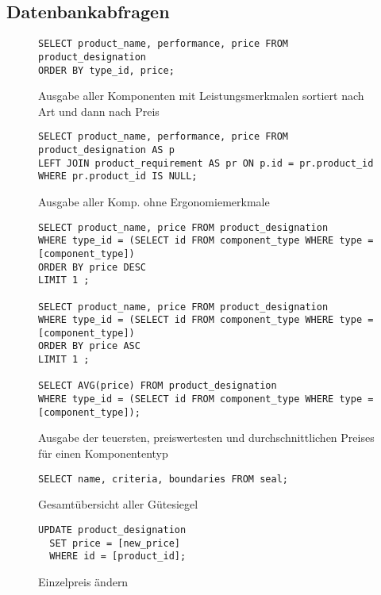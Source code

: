 \documentclass{article}
\begin{document}
\subsection{Datenbankabfragen}

\begin{figure}[!h]
\centering
\caption{
Ausgabe aller Komponenten mit Leistungsmerkmalen sortiert nach Art und dann nach Preis
}
\begin{lstlisting}
SELECT product_name, performance, price FROM product_designation
ORDER BY type_id, price;
\end{lstlisting}
\end{figure}
\begin{figure}[!h]
\centering
\caption{Ausgabe aller Komp. ohne Ergonomiemerkmale}
\begin{lstlisting}
SELECT product_name, performance, price FROM product_designation AS p
LEFT JOIN product_requirement AS pr ON p.id = pr.product_id
WHERE pr.product_id IS NULL;
\end{lstlisting}
\end{figure}
\begin{figure}[!h]
\centering
\caption{Ausgabe der teuersten, preiswertesten und durchschnittlichen Preises für einen Komponententyp}
\begin{lstlisting}
SELECT product_name, price FROM product_designation
WHERE type_id = (SELECT id FROM component_type WHERE type = [component_type])
ORDER BY price DESC 
LIMIT 1 ;

SELECT product_name, price FROM product_designation
WHERE type_id = (SELECT id FROM component_type WHERE type = [component_type])
ORDER BY price ASC 
LIMIT 1 ;

SELECT AVG(price) FROM product_designation
WHERE type_id = (SELECT id FROM component_type WHERE type = [component_type]);
\end{lstlisting}
\end{figure}
\begin{figure}[!h]
\centering

\caption{Gesamtübersicht aller Gütesiegel}
\begin{lstlisting}
SELECT name, criteria, boundaries FROM seal;
\end{lstlisting}
\end{figure}
\begin{figure}[!h]
\caption{Einzelpreis ändern}
\begin{lstlisting}
UPDATE product_designation
  SET price = [new_price]
  WHERE id = [product_id];
\end{lstlisting}
\end{figure}
\end{document}
